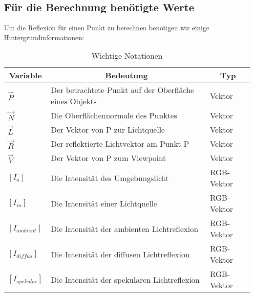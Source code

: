 \documentclass[a4paper]{scrartcl}%
\begin{document}
    \subsection{Für die Berechnung benötigte Werte}%
    \label{sub:fur_die_berechnung_benotigte_werte}
        Um die Reflexion für einen Punkt zu berechnen benötigen wir einige Hintergrundinformationen:\\
        \begin{table}[H]
        \caption{Wichtige Notationen}
        \label{table:vars}
        \begin{tabular}{l|l|l}
            \hline
            \multicolumn{1}{|c|}{Variable} & \multicolumn{1}{c|}{Bedeutung}                         & \multicolumn{1}{c|}{Typ} \\ \hline
            $\vec{P}$                              & Der betrachtete Punkt auf der Oberfläche eines Objekts & Vektor                   \\ \hline
            $\vec{N}$                              & Die Oberflächennormale des Punktes                     & Vektor                   \\ \hline
            $\vec{L}$                              & Der Vektor von P zur Lichtquelle                       & Vektor                   \\ \hline
            $\vec{R}$                              & Der reflektierte Lichtvektor am Punkt P                & Vektor                   \\ \hline
            $\vec{V}$                              & Der Vektor von P zum Viewpoint                         & Vektor                   \\ \hline
            $[I_{a}]$                    & Die Intensität des Umgebungslicht                      & RGB-Vektor               \\ \hline
            $[I_{in}]$                         & Die Intensität einer Lichtquelle                       & RGB-Vektor               \\ \hline
            $[I_{ambient}]$                         & Die Intensität der ambienten Lichtreflexion                       & RGB-Vektor               \\ \hline
            $[I_{diffus}]$                         & Die Intensität der diffusen Lichtreflexion                       & RGB-Vektor               \\ \hline
            $[I_{spekular}]$                         & Die Intensität der spekularen Lichtreflexion                       & RGB-Vektor               \\ \hline

\end{tabular}
\end{table}
\end{document}
